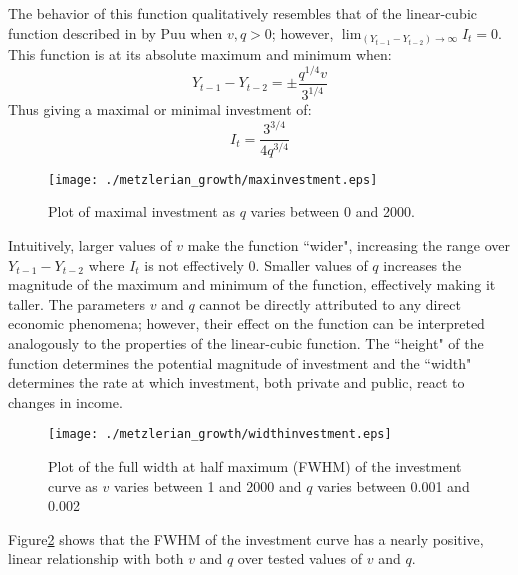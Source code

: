 The behavior of this function qualitatively resembles that of the linear-cubic function described in by Puu when $v,q>0$; however, $\lim_{(Y_{t-1}-Y_{t-2})\to\infty}I_t=0$. This function is at its absolute maximum and minimum when:
\begin{equation*}
    Y_{t-1}-Y_{t-2}=\pm\frac{q^{1/4}v}{3^{1/4}}
\end{equation*}
Thus giving a maximal or minimal investment of:
\begin{equation*}
    I_t=\frac{3^{3/4}}{4q^{3/4}}
\end{equation*}
\begin{figure}
    \centering
    \texttt{[image: ./metzlerian\_growth/maxinvestment.eps]}
    \caption{Plot of maximal investment as $q$ varies between 0 and 2000.}
    \label{metzlerian_growth-maxinvestment}
\end{figure}
Intuitively, larger values of $v$ make the function ``wider", increasing the range over $Y_{t-1}-Y_{t-2}$ where $I_t$ is not effectively 0. Smaller values of $q$ increases the magnitude of the maximum and minimum of the function, effectively making it taller. The parameters $v$ and $q$ cannot be directly attributed to any direct economic phenomena; however, their effect on the function can be interpreted analogously to the properties of the linear-cubic function. The ``height" of the function determines the potential magnitude of investment and the ``width" determines the rate at which investment, both private and public, react to changes in income.
\begin{figure}
    \centering
    \texttt{[image: ./metzlerian\_growth/widthinvestment.eps]}
    \caption{Plot of the full width at half maximum (FWHM) of the investment curve as $v$ varies between 1 and 2000 and $q$ varies between 0.001 and 0.002}
    \label{metzlerian_growth-widthinvestment}
\end{figure}
 Figure\ref{metzlerian_growth-widthinvestment} shows that the FWHM of the investment curve has a nearly positive, linear relationship with both $v$ and $q$ over tested values of $v$ and $q$.

